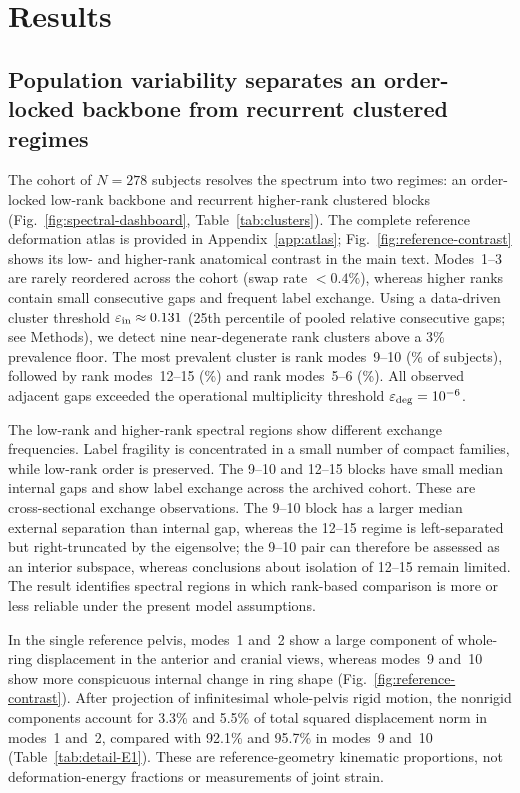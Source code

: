 \documentclass[pdflatex,sn-basic]{sn-jnl}
\begin{document}
\section{Results}
\label{sec:results}

\subsection{Population variability separates an order-locked backbone from recurrent clustered regimes}
\label{sec:spectral-results}

The cohort of $N{=}278$ subjects resolves the spectrum into two regimes: an order-locked low-rank backbone and recurrent higher-rank clustered blocks (Fig.~\ref{fig:spectral-dashboard}, Table~\ref{tab:clusters}).
The complete reference deformation atlas is provided in Appendix~\ref{app:atlas}; Fig.~\ref{fig:reference-contrast} shows its low- and higher-rank anatomical contrast in the main text. Modes~1--3 are rarely reordered across the cohort (swap rate $<0.4\%$), whereas higher ranks contain small consecutive gaps and frequent label exchange.
Using a data-driven cluster threshold $\varepsilon_{\rm in}\approx 0.131$ (25th percentile of pooled relative consecutive gaps; see Methods), we detect nine near-degenerate rank clusters above a 3\% prevalence floor.
The most prevalent cluster is rank modes~9--10 (\PrevalenceNineTen\% of subjects), followed by rank modes~12--15 (\PrevalenceTwelveFifteen\%) and rank modes~5--6 (\PrevalenceFiveSix\%).
All observed adjacent gaps exceeded the operational multiplicity threshold $\varepsilon_{\rm deg}=10^{-6}$.

The low-rank and higher-rank spectral regions show different exchange frequencies.
Label fragility is concentrated in a small number of compact families, while low-rank order is preserved.
The 9--10 and 12--15 blocks have small median internal gaps and show label exchange across the archived cohort. These are cross-sectional exchange observations.
The 9--10 block has a larger median external separation than internal gap, whereas the 12--15 regime is left-separated but right-truncated by the eigensolve; the 9--10 pair can therefore be assessed as an interior subspace, whereas conclusions about isolation of 12--15 remain limited.
The result identifies spectral regions in which rank-based comparison is more or less reliable under the present model assumptions.


In the single reference pelvis, modes~1 and~2 show a large component of whole-ring displacement in the anterior and cranial views, whereas modes~9 and~10 show more conspicuous internal change in ring shape (Fig.~\ref{fig:reference-contrast}). After projection of infinitesimal whole-pelvis rigid motion, the nonrigid components account for 3.3\% and 5.5\% of total squared displacement norm in modes~1 and~2, compared with 92.1\% and 95.7\% in modes~9 and~10 (Table~\ref{tab:detail-E1}). These are reference-geometry kinematic proportions, not deformation-energy fractions or measurements of joint strain.
\end{document}
